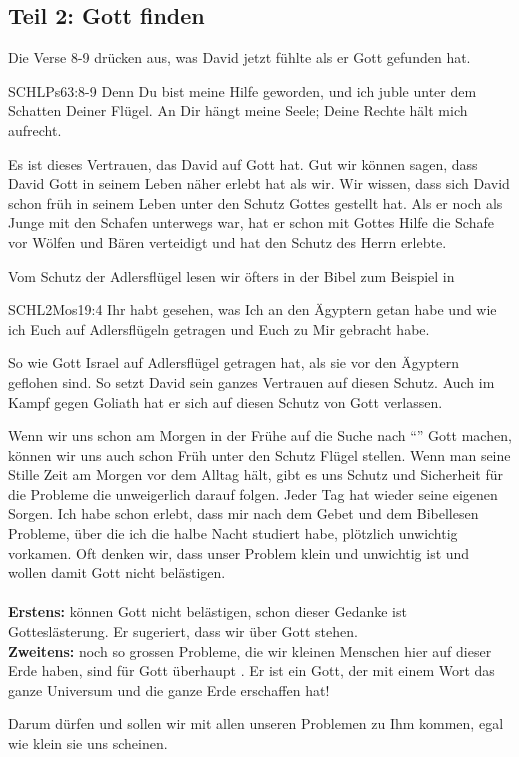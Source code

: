 \documentclass[fontsize=16pt]{mybib}
\begin{document}
    \subsection*{Teil 2: Gott finden}
    \begin{otsblock}
        Die Verse 8-9 drücken aus, was David jetzt fühlte als er Gott gefunden hat.
        \begin{bibelbox}{SCHL}{Ps}{63:8-9}
            Denn Du bist meine Hilfe geworden, und ich juble unter dem Schatten Deiner Flügel. An Dir hängt meine Seele; Deine Rechte hält mich aufrecht.
        \end{bibelbox}
        Es ist dieses Vertrauen, das David auf Gott hat. Gut wir können sagen, dass David Gott in seinem Leben näher erlebt hat als wir. Wir wissen, dass sich David schon früh in seinem Leben unter den Schutz Gottes gestellt hat. Als er noch als Junge mit den Schafen unterwegs war, hat er schon mit Gottes Hilfe die Schafe vor Wölfen und Bären verteidigt und hat den Schutz des Herrn erlebte.

        Vom Schutz der Adlersflügel lesen wir öfters in der Bibel zum Beispiel in
        \begin{bibelbox}{SCHL}{2Mos}{19:4}
            Ihr habt gesehen, was Ich an den Ägyptern getan habe und wie ich Euch auf Adlersflügeln getragen und Euch zu Mir gebracht habe.
        \end{bibelbox}
         So wie Gott Israel auf Adlersflügel getragen hat, als sie vor den Ägyptern geflohen sind. So setzt David sein ganzes Vertrauen auf diesen Schutz. Auch im Kampf gegen Goliath hat er sich auf diesen Schutz von Gott verlassen. 
    \end{otsblock}
    \begin{otsblock}
        Wenn wir uns schon am Morgen in der Frühe auf die Suche nach \enquote{} Gott machen, können wir uns auch schon Früh unter den Schutz  Flügel stellen. Wenn man seine Stille Zeit am Morgen vor dem Alltag hält, gibt es uns Schutz und Sicherheit für die Probleme die unweigerlich darauf folgen. Jeder Tag hat wieder seine eigenen Sorgen. 
        Ich habe schon erlebt, dass mir nach dem Gebet und dem Bibellesen Probleme, über die ich die halbe Nacht studiert habe, plötzlich unwichtig vorkamen. Oft denken wir, dass unser Problem klein und unwichtig ist und wollen damit Gott nicht belästigen.\\        
         \\        
        \textbf{Erstens:}  können Gott nicht belästigen, schon dieser Gedanke ist Gotteslästerung. Er sugeriert, dass wir über Gott stehen. \\        
        \textbf{Zweitens:}  noch so grossen Probleme, die wir kleinen Menschen hier auf dieser Erde haben, sind für Gott überhaupt . Er ist ein Gott, der mit einem Wort das ganze Universum und die ganze Erde erschaffen hat!

        Darum dürfen und sollen wir mit allen unseren Problemen zu Ihm kommen, egal wie klein sie uns scheinen.
    \end{otsblock}
\end{document}
